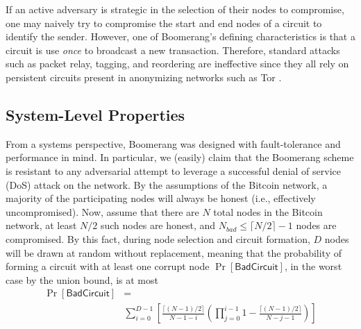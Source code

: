 
If an active adversary is strategic in the selection of their nodes to compromise, one may naively try to compromise the start and end nodes of a circuit to identify the sender. However, one of Boomerang's defining characteristics is that a circuit is use \emph{once} to broadcast a new transaction. Therefore, standard attacks such as packet relay, tagging, and reordering are ineffective since they all rely on persistent circuits present in anonymizing networks such as Tor \cite{tor}. 


\subsection{System-Level Properties}
From a systems perspective, Boomerang was designed with fault-tolerance and performance in mind. In particular, we (easily) claim that the Boomerang scheme is resistant to any adversarial attempt to leverage a successful denial of service (DoS) attack on the network. By the assumptions of the Bitcoin network, a majority of the participating nodes will always be honest (i.e., effectively uncompromised). Now, assume that there are $N$ total nodes in the Bitcoin network, at least $N/2$ such nodes are honest, and $N_{bad} \leq \lceil N/2 \rceil - 1$ nodes are compromised. By this fact, during node selection and circuit formation, $D$ nodes will be drawn at random without replacement, meaning that the probability of forming a circuit with at least one corrupt node $\Pr[\mathsf{BadCircuit}]$, in the worst case by the union bound, is at most
\begin{align*}
\Pr[\mathsf{BadCircuit}] & = \\
& \sum_{i=0}^{D-1} \left[ \frac{\lceil (N-1)/2 \rceil}{N - 1 - i}\left( \prod_{j=0}^{i-1} 1 - \frac{ \lceil (N-1)/2 \rceil}{N-j-1} \right) \right]
\end{align*}

